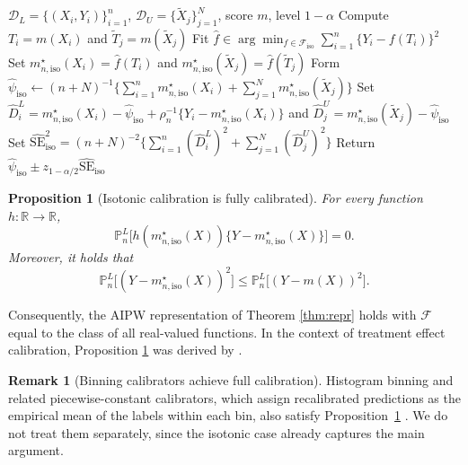 \documentclass{article}
\theoremstyle{plain}
\newtheorem{proposition}{Proposition}
\theoremstyle{definition}
\newtheorem{remark}{Remark}
\newcommand{\R}{\mathbb{R}}
\newcommand{\1}{\mathbbm{1}}
\newcommand{\mhat}{m}
\newcommand{\rhon}{\rho_n}
\newcommand{\Pl}{\mathbb{P}^{L}_n}
\begin{document}
\begin{algorithm}[t]
\caption{Isotonic-calibrated plug-in estimator}
\label{alg:isoppi}
\begin{algorithmic}[1]
\Require \(\mathcal D_L=\{(X_i,Y_i)\}_{i=1}^n\), \(\mathcal D_U=\{\widetilde X_j\}_{j=1}^N\), score \(\mhat\), level \(1-\alpha\)
\State Compute \(T_i=\mhat(X_i)\) and \(\widetilde T_j=\mhat(\widetilde X_j)\)
\State Fit \(\hat f\in\arg\min_{f\in\mathcal F_{\mathrm{iso}}}\sum_{i=1}^n\{Y_i-f(T_i)\}^2\)
\State Set \(m_{n,\mathrm{iso}}^\star(X_i)=\hat f(T_i)\) and \(m_{n,\mathrm{iso}}^\star(\widetilde X_j)=\hat f(\widetilde T_j)\)
\State Form \(\widehat\psi_{\mathrm{iso}}\gets (n+N)^{-1}\{\sum_{i=1}^n m_{n,\mathrm{iso}}^\star(X_i)+\sum_{j=1}^N m_{n,\mathrm{iso}}^\star(\widetilde X_j)\}\)
\State Set \(\widehat D_i^L=m_{n,\mathrm{iso}}^\star(X_i)-\widehat\psi_{\mathrm{iso}}+\rhon^{-1}\{Y_i-m_{n,\mathrm{iso}}^\star(X_i)\}\) and \(\widehat D_j^U=m_{n,\mathrm{iso}}^\star(\widetilde X_j)-\widehat\psi_{\mathrm{iso}}\)
\State Set \(\widehat{\mathrm{SE}}_{\mathrm{iso}}^2=(n+N)^{-2}\{\sum_{i=1}^n(\widehat D_i^L)^2+\sum_{j=1}^N(\widehat D_j^U)^2\}\)
\State Return \(\widehat\psi_{\mathrm{iso}} \pm z_{1-\alpha/2}\widehat{\mathrm{SE}}_{\mathrm{iso}}\)
\end{algorithmic}
\end{algorithm}
 

\begin{proposition}[Isotonic calibration is fully calibrated]
\label{prop:iso-repr}
For every function \(h:\R\to\R\),
\begin{equation}
\label{eq:orth}
\Pl\bigl[h(m_{n,\mathrm{iso}}^\star(X))\{Y-m_{n,\mathrm{iso}}^\star(X)\}\bigr]=0.
\end{equation}
Moreover, it holds that
\[
\Pl\bigl[(Y-m_{n,\mathrm{iso}}^\star(X))^2\bigr]
\le
\Pl\bigl[(Y-\mhat(X))^2\bigr].
\]
\end{proposition}

Consequently, the AIPW representation of Theorem \ref{thm:repr} holds with \(\mathcal F\) equal to the class of all real-valued functions. In the context of treatment effect calibration, Proposition \ref{prop:iso-repr} was derived by \citet{van2023causal}.

 
 


\begin{remark}[Binning calibrators achieve full calibration]
Histogram binning and related piecewise-constant calibrators, which assign recalibrated predictions as the empirical mean of the labels within each bin, also satisfy Proposition~\ref{prop:iso-repr} \citep{van2025venn}. We do not treat them separately, since the isotonic case already captures the main argument.
\end{remark}
\end{document}
